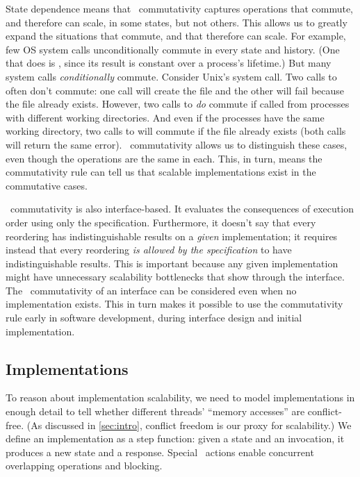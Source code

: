 State dependence means that \SIM\ commutativity captures operations that
commute, and therefore can scale, in some states, but not others.
%
This allows us to greatly expand the situations that commute,
and that therefore can scale.
%
For example, few OS system calls unconditionally commute in
every state and history.
%
(One that does is , since its result is constant over a
process's lifetime.)
%
But many system calls \emph{conditionally} commute.
%
Consider Unix's  system call.
%
Two calls to  often don't
commute: one call will create the file and the other will
fail because the file already exists.
%
However, two calls to  \emph{do}
commute if called from processes with different working
directories.  And even if the processes have the same working
directory, two calls to  will commute
{if the file already exists} (both
calls will return the same error).
%
\SIM\ commutativity allows us to distinguish these cases, even though the
operations are the same in each.  This, in turn, means the commutativity
rule can tell us that scalable implementations exist in the commutative
cases.

\SIM\ commutativity is also interface-based.
%
It evaluates the consequences of execution order using only the
specification.
%
Furthermore, it doesn't say that every reordering has indistinguishable
results on a \emph{given} implementation; it requires instead that
every reordering \emph{is allowed by the specification} to have
indistinguishable results. This is important because any given
implementation might
have unnecessary scalability bottlenecks that show through the
interface. The \SIM\ commutativity of an interface can be
considered even when no implementation exists. This in turn makes it
possible to use the commutativity rule early in software development,
during interface design and initial implementation.



\subsection{Implementations}

To reason about implementation scalability, we need to model
implementations in enough detail to tell
whether different threads' ``memory accesses'' are conflict-free. (As 
discussed in \cref{sec:intro}, conflict freedom is our proxy for
scalability.) We define an implementation as a step
function: given a state and an invocation, it produces a new state and a
response. Special \CONTINUE\ actions enable
concurrent overlapping operations and blocking.

